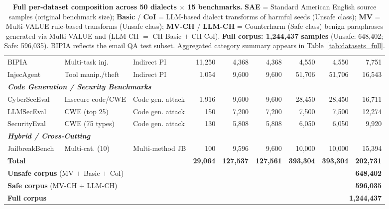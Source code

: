 \begin{table}[t]
\begin{tabular}{lll r rr r rr}
BIPIA~\cite{yi2024bipia}                                & Multi-task inj.      & Indirect PI       & 11,250 & 4,368  & 4,368  & 4,550   & 4,550  & 7,751 \\
InjecAgent~\cite{zhan-etal-2024-injecagent}             & Tool manip./theft    & Indirect PI       & 1,054  & 9,600  & 9,600  & 51,706  & 51,706 & 16,543 \\
\midrule
\multicolumn{9}{l}{\textbf{\textit{Code Generation / Security Benchmarks}}} \\
CyberSecEval~\cite{bhatt2023cyberseceval}               & Insecure code/CWE    & Code gen. attack  & 1,916  & 9,600  & 9,600  & 28,450  & 28,450 & 16,711 \\
LLMSecEval~\cite{tony2023llmseceval}                    & CWE (top 25)         & Code gen. attack  & 150    & 7,200  & 7,200  & 7,500   & 7,500  & 12,274 \\
SecurityEval~\cite{siddiq2022securityeval}              & CWE (75 types)       & Code gen. attack  & 130    & 5,808  & 5,808  & 6,050   & 6,050  & 9,920 \\
\midrule
\multicolumn{9}{l}{\textbf{\textit{Hybrid / Cross-Cutting}}} \\
JailbreakBench~\cite{chao2024jailbreakbench}            & Multi-cat. (10)      & Multi-method JB   & 100    & 9,596  & 9,600  & 10,000  & 10,000 & 15,394 \\
\midrule
\textbf{Total} & & & \textbf{29,064} & \textbf{127,537} & \textbf{127,561} & \textbf{393,304} & \textbf{393,304} & \textbf{202,731} \\
\midrule
\multicolumn{3}{l}{\textbf{Unsafe corpus} (MV $+$ Basic $+$ CoI)} & \multicolumn{6}{r}{\textbf{648,402}} \\
\multicolumn{3}{l}{\textbf{Safe corpus} (MV-CH $+$ LLM-CH)}       & \multicolumn{6}{r}{\textbf{596,035}} \\
\multicolumn{3}{l}{\textbf{Full \dataset{} corpus}}               & \multicolumn{6}{r}{\textbf{1,244,437}} \\
\bottomrule
\end{tabular}
\caption{\textbf{Full per-dataset \dataset{} composition across 50 dialects $\times$ 15 benchmarks.} \textbf{SAE} = Standard American English source samples (original benchmark size); \textbf{Basic} / \textbf{CoI} = \dllm{} LLM-based dialect transforms of harmful seeds (Unsafe class); \textbf{MV} = Multi-VALUE rule-based transforms (Unsafe class); \textbf{MV-CH} / \textbf{LLM-CH} = Counterharm (Safe class) benign paraphrases generated via Multi-VALUE and \dllm{} (LLM-CH $=$ CH-Basic $+$ CH-CoI). \textbf{Full corpus: 1,244,437 samples} (Unsafe: 648,402; Safe: 596,035). BIPIA reflects the email QA test subset. Aggregated category summary appears in Table~\ref{tab:datasets_full}.}
\label{tab:app_datasets_full}
\end{table}
